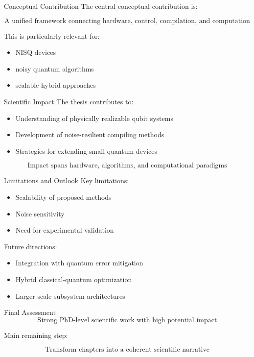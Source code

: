 \documentclass[aspectratio=169]{beamer}
\begin{document}
\begin{frame}{Conceptual Contribution}
The central conceptual contribution is:

\[
\boxed{
\text{A unified framework connecting hardware, control, compilation, and computation}
}
\]

\medskip

This is particularly relevant for:
\begin{itemize}
    \item NISQ devices
    \item noisy quantum algorithms
    \item scalable hybrid approaches
\end{itemize}
\end{frame}

\begin{frame}{Scientific Impact}
The thesis contributes to:

\begin{itemize}
    \item Understanding of physically realizable qubit systems
    \item Development of noise-resilient compiling methods
    \item Strategies for extending small quantum devices
\end{itemize}

\medskip

\[
\text{Impact spans hardware, algorithms, and computational paradigms}
\]
\end{frame}

\begin{frame}{Limitations and Outlook}
Key limitations:

\begin{itemize}
    \item Scalability of proposed methods
    \item Noise sensitivity
    \item Need for experimental validation
\end{itemize}

\medskip

Future directions:

\begin{itemize}
    \item Integration with quantum error mitigation
    \item Hybrid classical-quantum optimization
    \item Larger-scale subsystem architectures
\end{itemize}
\end{frame}

\begin{frame}{Final Assessment}
\[
\boxed{
\text{Strong PhD-level scientific work with high potential impact}
}
\]

\medskip

Main remaining step:

\[
\boxed{
\text{Transform chapters into a coherent scientific narrative}
}
\]


\end{frame}
\end{document}
